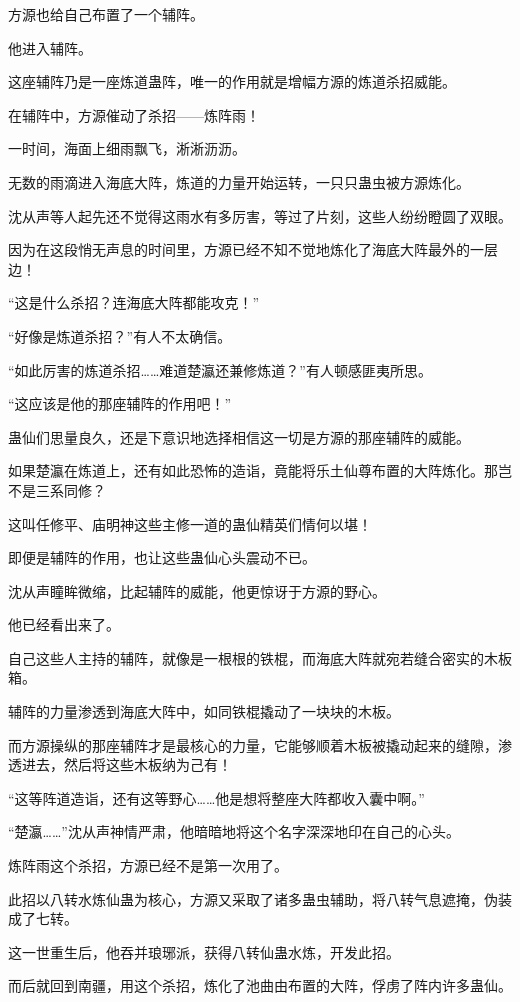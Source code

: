 \begin{this_body}
方源也给自己布置了一个辅阵。

他进入辅阵。

这座辅阵乃是一座炼道蛊阵，唯一的作用就是增幅方源的炼道杀招威能。

在辅阵中，方源催动了杀招——炼阵雨！

一时间，海面上细雨飘飞，淅淅沥沥。

无数的雨滴进入海底大阵，炼道的力量开始运转，一只只蛊虫被方源炼化。

沈从声等人起先还不觉得这雨水有多厉害，等过了片刻，这些人纷纷瞪圆了双眼。

因为在这段悄无声息的时间里，方源已经不知不觉地炼化了海底大阵最外的一层边！

“这是什么杀招？连海底大阵都能攻克！”

“好像是炼道杀招？”有人不太确信。

“如此厉害的炼道杀招……难道楚瀛还兼修炼道？”有人顿感匪夷所思。

“这应该是他的那座辅阵的作用吧！”

蛊仙们思量良久，还是下意识地选择相信这一切是方源的那座辅阵的威能。

如果楚瀛在炼道上，还有如此恐怖的造诣，竟能将乐土仙尊布置的大阵炼化。那岂不是三系同修？

这叫任修平、庙明神这些主修一道的蛊仙精英们情何以堪！

即便是辅阵的作用，也让这些蛊仙心头震动不已。

沈从声瞳眸微缩，比起辅阵的威能，他更惊讶于方源的野心。

他已经看出来了。

自己这些人主持的辅阵，就像是一根根的铁棍，而海底大阵就宛若缝合密实的木板箱。

辅阵的力量渗透到海底大阵中，如同铁棍撬动了一块块的木板。

而方源操纵的那座辅阵才是最核心的力量，它能够顺着木板被撬动起来的缝隙，渗透进去，然后将这些木板纳为己有！

“这等阵道造诣，还有这等野心……他是想将整座大阵都收入囊中啊。”

“楚瀛……”沈从声神情严肃，他暗暗地将这个名字深深地印在自己的心头。

炼阵雨这个杀招，方源已经不是第一次用了。

此招以八转水炼仙蛊为核心，方源又采取了诸多蛊虫辅助，将八转气息遮掩，伪装成了七转。

这一世重生后，他吞并琅琊派，获得八转仙蛊水炼，开发此招。

而后就回到南疆，用这个杀招，炼化了池曲由布置的大阵，俘虏了阵内许多蛊仙。


\end{this_body}
